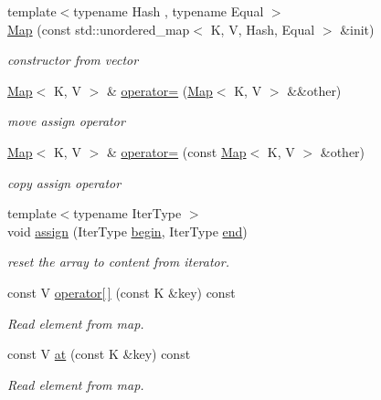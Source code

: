 \begin{DoxyCompactItemize}
{\footnotesize template$<$typename Hash , typename Equal $>$ }\\\hyperlink{classtvm_1_1Map_a13a270f095bad489247edf8e0d15f9c9}{Map} (const std\+::unordered\+\_\+map$<$ K, V, Hash, Equal $>$ \&init)
\begin{DoxyCompactList}\small\item\em constructor from vector \end{DoxyCompactList}\item 
\hyperlink{classtvm_1_1Map}{Map}$<$ K, V $>$ \& \hyperlink{classtvm_1_1Map_acf11920f50d9a6283cd2f1ed9985bfca}{operator=} (\hyperlink{classtvm_1_1Map}{Map}$<$ K, V $>$ \&\&other)
\begin{DoxyCompactList}\small\item\em move assign operator \end{DoxyCompactList}\item 
\hyperlink{classtvm_1_1Map}{Map}$<$ K, V $>$ \& \hyperlink{classtvm_1_1Map_a4572b0679e99399dc42e139d3d773349}{operator=} (const \hyperlink{classtvm_1_1Map}{Map}$<$ K, V $>$ \&other)
\begin{DoxyCompactList}\small\item\em copy assign operator \end{DoxyCompactList}\item 
{\footnotesize template$<$typename Iter\+Type $>$ }\\void \hyperlink{classtvm_1_1Map_a7733c37bc18f3df529e3b2fdc01a072f}{assign} (Iter\+Type \hyperlink{classtvm_1_1Map_abd05e398b026981426bce7c45c51e0aa}{begin}, Iter\+Type \hyperlink{classtvm_1_1Map_a0b475776d062f8fc32842e054d5674bd}{end})
\begin{DoxyCompactList}\small\item\em reset the array to content from iterator. \end{DoxyCompactList}\item 
const V \hyperlink{classtvm_1_1Map_ac12a408b9dad9e7309aa12002b217fce}{operator\mbox{[}$\,$\mbox{]}} (const K \&key) const 
\begin{DoxyCompactList}\small\item\em Read element from map. \end{DoxyCompactList}\item 
const V \hyperlink{classtvm_1_1Map_aa95a8fa173498e69eceba1aec8e49aba}{at} (const K \&key) const 
\begin{DoxyCompactList}\small\item\em Read element from map. \end{DoxyCompactList}\item 

\end{DoxyCompactItemize}
